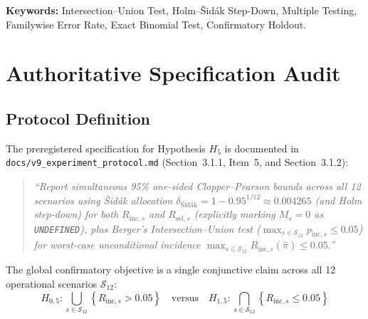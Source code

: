 \documentclass[10pt,a4paper]{article}
\begin{document}
\vspace{6pt}
\noindent \textbf{Keywords:} Intersection--Union Test, Holm--Šidák Step-Down, Multiple Testing, Familywise Error Rate, Exact Binomial Test, Confirmatory Holdout.

\section{Authoritative Specification Audit}

\subsection{Protocol Definition}
The preregistered specification for Hypothesis $H_5$ is documented in \texttt{docs/v9\_experiment\_protocol.md} (Section~3.1.1, Item~5, and Section~3.1.2):
\begin{quote}
\textit{``Report simultaneous 95\% one-sided Clopper--Pearson bounds across all 12 scenarios using Šidák allocation $\delta_{\mathrm{Šidák}} = 1 - 0.95^{1/12} \approx 0.004265$ (and Holm step-down) for both $R_{\mathrm{inc},s}$ and $R_{\mathrm{sel},s}$ (explicitly marking $M_s = 0$ as \texttt{UNDEFINED}), plus Berger's Intersection--Union test ($\max_{s \in \mathcal{S}_{12}} p_{\mathrm{inc},s} \le 0.05$) for worst-case unconditional incidence $\max_{s \in \mathcal{S}_{12}} R_{\mathrm{inc},s}(\hat{\pi}) \le 0.05$.''}
\end{quote}
The global confirmatory objective is a single conjunctive claim across all 12 operational scenarios $\mathcal{S}_{12}$:
\begin{equation}
H_{0,5}: \bigcup_{s \in \mathcal{S}_{12}} \left\{ R_{\mathrm{inc}, s} > 0.05 \right\} \quad \text{versus} \quad H_{1,5}: \bigcap_{s \in \mathcal{S}_{12}} \left\{ R_{\mathrm{inc}, s} \le 0.05 \right\}
\end{equation}
\end{document}
